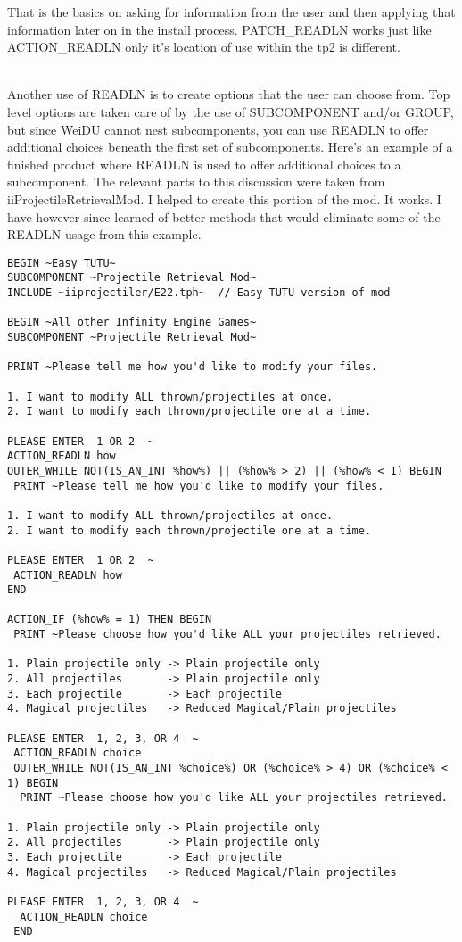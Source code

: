 \documentclass{article}
\begin{document}
That is the basics on asking for information from the user and then applying that
information later on in the install process.  PATCH_READLN works just like
ACTION_READLN only it's location of use within the tp2 is different.

\\

Another use of READLN is to create options that the user can choose from.
Top level options are taken care of by the use of SUBCOMPONENT and/or GROUP, but since
WeiDU cannot nest subcomponents, you can use READLN to offer additional choices beneath
the first set of subcomponents.  Here's an example of a finished product where READLN is
used to offer additional choices to a subcomponent.  The relevant parts to this discussion
were taken from iiProjectileRetrievalMod.  I helped to create this portion of the mod.
It works.  I have however since learned of better methods that would eliminate some of the
READLN usage from this example.

\begin{verbatim}
BEGIN ~Easy TUTU~
SUBCOMPONENT ~Projectile Retrieval Mod~
INCLUDE ~iiprojectiler/E22.tph~  // Easy TUTU version of mod

BEGIN ~All other Infinity Engine Games~
SUBCOMPONENT ~Projectile Retrieval Mod~

PRINT ~Please tell me how you'd like to modify your files.

1. I want to modify ALL thrown/projectiles at once.
2. I want to modify each thrown/projectile one at a time.

PLEASE ENTER  1 OR 2  ~
ACTION_READLN how
OUTER_WHILE NOT(IS_AN_INT %how%) || (%how% > 2) || (%how% < 1) BEGIN
 PRINT ~Please tell me how you'd like to modify your files.

1. I want to modify ALL thrown/projectiles at once.
2. I want to modify each thrown/projectile one at a time.

PLEASE ENTER  1 OR 2  ~
 ACTION_READLN how
END

ACTION_IF (%how% = 1) THEN BEGIN
 PRINT ~Please choose how you'd like ALL your projectiles retrieved.

1. Plain projectile only -> Plain projectile only
2. All projectiles       -> Plain projectile only
3. Each projectile       -> Each projectile
4. Magical projectiles   -> Reduced Magical/Plain projectiles

PLEASE ENTER  1, 2, 3, OR 4  ~
 ACTION_READLN choice
 OUTER_WHILE NOT(IS_AN_INT %choice%) OR (%choice% > 4) OR (%choice% < 1) BEGIN
  PRINT ~Please choose how you'd like ALL your projectiles retrieved.

1. Plain projectile only -> Plain projectile only
2. All projectiles       -> Plain projectile only
3. Each projectile       -> Each projectile
4. Magical projectiles   -> Reduced Magical/Plain projectiles

PLEASE ENTER  1, 2, 3, OR 4  ~
  ACTION_READLN choice
 END
\end{verbatim}
\end{document}
